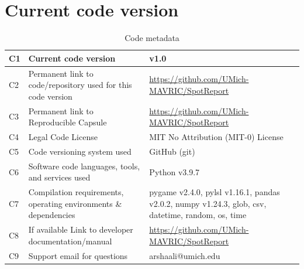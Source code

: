 \documentclass[preprint,12pt, a4paper]{elsarticle}
\begin{document}







\section*{Current code version}
\label{}

\begin{table}[!h]
\caption{Code metadata}
\label{tab:code_metadata} 
\begin{tabular}{|l|p{6.5cm}|p{6.5cm}|}
\hline
C1 & Current code version & v1.0 \\
\hline
C2 & Permanent link to code/repository used for this code version & \url{https://github.com/UMich-MAVRIC/SpotReport}\\
\hline
C3  & Permanent link to Reproducible Capsule & \url{https://github.com/UMich-MAVRIC/SpotReport}\\
\hline
C4 & Legal Code License   & MIT No Attribution (MIT-0) License \\
\hline
C5 & Code versioning system used & GitHub (git) \\
\hline
C6 & Software code languages, tools, and services used & Python v3.9.7 \\
\hline
C7 & Compilation requirements, operating environments \& dependencies & pygame v2.4.0, pylsl v1.16.1, pandas v2.0.2, numpy v1.24.3, glob, csv, datetime, random, os, time \\
\hline
C8 & If available Link to developer documentation/manual &  \url{https://github.com/UMich-MAVRIC/SpotReport} \\
\hline
C9 & Support email for questions & arshaali@umich.edu\\
\hline
\end{tabular}
\end{table}
\end{document}
